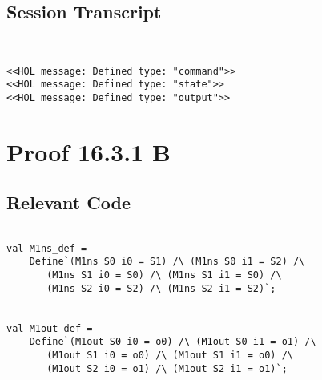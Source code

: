 \documentclass{report}
\begin{document}
\subsection{Session Transcript}
\label{trans1}
\begin{session}
  \begin{scriptsize}
\begin{verbatim}


<<HOL message: Defined type: "command">>
<<HOL message: Defined type: "state">>
<<HOL message: Defined type: "output">>

\end{verbatim}
  \end{scriptsize}
\end{session}
\pagebreak

\section{Proof 16.3.1 B}
\label{proof-2}

\subsection{Relevant Code}
\label{rel-code-2}
\begin{lstlisting}[frame=TBlr]

val M1ns_def =
    Define`(M1ns S0 i0 = S1) /\ (M1ns S0 i1 = S2) /\
       (M1ns S1 i0 = S0) /\ (M1ns S1 i1 = S0) /\
       (M1ns S2 i0 = S2) /\ (M1ns S2 i1 = S2)`;


val M1out_def =
    Define`(M1out S0 i0 = o0) /\ (M1out S0 i1 = o1) /\
       (M1out S1 i0 = o0) /\ (M1out S1 i1 = o0) /\
       (M1out S2 i0 = o1) /\ (M1out S2 i1 = o1)`;

\end{lstlisting}
\end{document}
